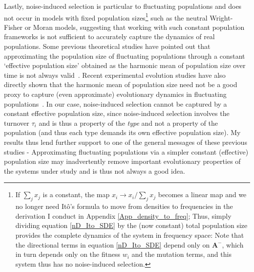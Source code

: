 Lastly, noise-induced selection is particular to fluctuating populations and does not occur in models with fixed population sizes\footnote{If $\sum_j x_j$ is a constant, the map $x_i \to x_i/\sum_j x_j$ becomes a linear map and we no longer need It\^o's formula to move from densities to frequencies in the derivation I conduct in Appendix \ref{App_density_to_freq}; Thus, simply dividing equation \eqref{nD_Ito_SDE} by the (now constant) total population size provides the complete dynamics of the system in frequency space: Note that the directional terms in equation \eqref{nD_Ito_SDE} depend only on $\mathbf{A}^-$, which in turn depends only on the fitness $w_i$ and the mutation terms, and this system thus has no noise-induced selection.} such as the neutral Wright-Fisher or Moran models, suggesting that working with such constant population frameworks is not sufficient to accurately capture the dynamics of real populations. Some previous theoretical studies have pointed out that approximating the population size of fluctuating populations through a constant `effective population size' obtained as the harmonic mean of population size over time is not always valid~\citep{sjodin_meaning_2005,parsons_consequences_2010,iizuka_effective_2010,abu_awad_effects_2018,kuosmanen_turnover_2022}. Recent experimental evolution studies have also directly shown that the harmonic mean of population size need not be a good proxy to capture (even approximate) evolutionary dynamics in fluctuating populations~\citep{chavhan_larger_2019}. In our case, noise-induced selection cannot be captured by a constant effective population size, since noise-induced selection involves the turnover $\tau_i$ and is thus a property of the \emph{type} and not a property of the population (and thus each type demands its own effective population size). My results thus lend further support to one of the general messages of these previous studies - Approximating fluctuating populations via a simpler constant (effective) population size may inadvertently remove important evolutionary properties of the systems under study and is thus not always a good idea.

